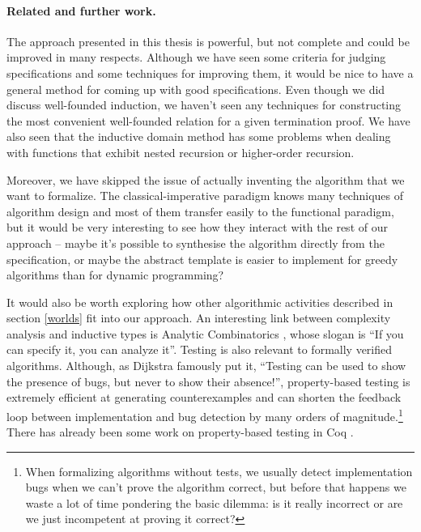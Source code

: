 \documentclass[declaration,mgr,english,shortabstract]{iithesis}
\begin{document}
\paragraph{Related and further work.}{The approach presented in this thesis is powerful, but not complete and could be improved in many respects. Although we have seen some criteria for judging specifications and some techniques for improving them, it would be nice to have a general method for coming up with good specifications. Even though we did discuss well-founded induction, we haven't seen any techniques for constructing the most convenient well-founded relation for a given termination proof. We have also seen that the inductive domain method has some problems when dealing with functions that exhibit nested recursion or higher-order recursion.

Moreover, we have skipped the issue of actually inventing the algorithm that we want to formalize. The classical-imperative paradigm knows many techniques of algorithm design and most of them transfer easily to the functional paradigm, but it would be very interesting to see how they interact with the rest of our approach -- maybe it's possible to synthesise the algorithm directly from the specification, or maybe the abstract template is easier to implement for greedy algorithms than for dynamic programming?

It would also be worth exploring how other algorithmic activities described in section \ref{worlds} fit into our approach. An interesting link between complexity analysis and inductive types is Analytic Combinatorics \cite{AnalyticCombinatorics}, whose slogan is ``If you can specify it, you can analyze it''. Testing is also relevant to formally verified algorithms. Although, as Dijkstra famously put it, ``Testing can be used to show the presence of bugs, but never to show their absence!'', property-based testing is extremely efficient at generating counterexamples and can shorten the feedback loop between implementation and bug detection by many orders of magnitude.\footnote{When formalizing algorithms without tests, we usually detect implementation bugs when we can't prove the algorithm correct, but before that happens we waste a lot of time pondering the basic dilemma: is it really incorrect or are we just incompetent at proving it correct?} There has already been some work on property-based testing in Coq \cite{SF4}.}

\end{document}

